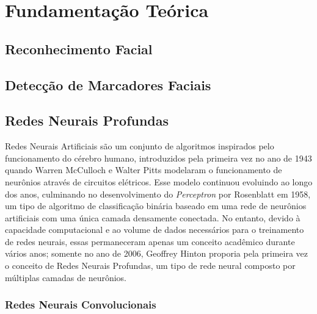 \chapter{Fundamentação Teórica}

\section{Reconhecimento Facial}
\label{sec:facialrecog}

\section{Detecção de Marcadores Faciais}
\label{sec:faciallm}

\section{Redes Neurais Profundas}
\label{sec:dnn}

Redes Neurais Artificiais são um conjunto de algoritmos inspirados pelo funcionamento do cérebro humano, introduzidos pela primeira vez no ano de 1943 quando Warren McCulloch e Walter Pitts modelaram o funcionamento de neurônios através de circuitos elétricos\cite{mccullochLogicalCalculusIdeas1943}.
Esse modelo continuou evoluindo ao longo dos anos, culminando no desenvolvimento do \textit{Perceptron} por Rosenblatt em 1958\cite{rosenblattPerceptronProbabilisticModel1958}, um tipo de algoritmo de classificação binária baseado em uma rede de neurônios artificiais com uma única camada densamente conectada.
No entanto, devido à capacidade computacional e ao volume de dados necessários para o treinamento de redes neurais, essas permaneceram apenas um conceito acadêmico durante vários anos; somente no ano de 2006, Geoffrey Hinton proporia pela primeira vez o conceito de Redes Neurais Profundas\cite{hintonFastLearningAlgorithm2006}, um tipo de rede neural composto por múltiplas camadas de neurônios.




\subsection{Redes Neurais Convolucionais}
\label{sec:convnet}